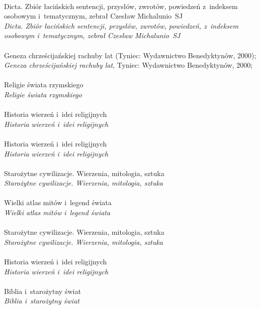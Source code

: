 \documentclass[a4paper,11pt]{article}
\begin{document}
\noindent
{} \\
\Jest Dicta. Zbiór łacińskich sentencji, przysłów, zwrotów, powiedzeń
z~indeksem osobowym i~tematycznym, zebrał Czesław Michalunio~SJ \\
\Powin \emph{Dicta. Zbiór łacińskich sentencji, przysłów, zwrotów,
  powiedzeń, z~indeksem osobowym i~tematycznym,
  zebrał Czesław Michalunio~SJ} \\
 \\
\Jest Geneza chrześcijańskiej rachuby lat (Tyniec: Wydawnictwo
Benedyktynów, 2000); \\
\Powin \emph{Geneza chrześcijańskiej rachuby lat}, Tyniec: Wydawnictwo
Benedyktynów, 2000; \\
 \\
\Jest  Religie świata rzymskiego \\
\Powin \emph{Religie świata rzymskiego} \\
 \\
\Jest  Historia wierzeń i~idei religijnych \\
\Powin \emph{Historia wierzeń i~idei religijnych} \\
 \\
\Jest  Historia wierzeń i~idei religijnych \\
\Powin \emph{Historia wierzeń i~idei religijnych} \\
 \\
\Jest  Starożytne cywilizacje. Wierzenia, mitologia, sztuka \\
\Powin \emph{Starożytne cywilizacje. Wierzenia, mitologia, sztuka} \\
 \\
\Jest  Wielki atlas mitów i~legend świata \\
\Powin \emph{Wielki atlas mitów i~legend świata} \\
 \\
\Jest  Starożytne cywilizacje. Wierzenia, mitologia, sztuka \\
\Powin \emph{Starożytne cywilizacje. Wierzenia, mitologia, sztuka} \\
 \\
\Jest  Historia wierzeń i~idei religijnych \\
\Powin \emph{Historia wierzeń i~idei religijnych} \\
 \\
\Jest  Biblia i~starożytny świat \\
\Powin \emph{Biblia i~starożytny świat} \\
\end{document}
